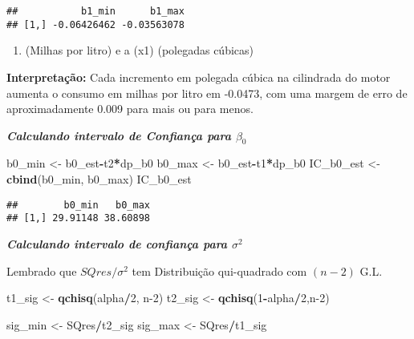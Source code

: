 \documentclass[
]{article}
\newenvironment{Shaded}{\begin{snugshade}}{\end{snugshade}}
\newcommand{\DecValTok}[1]{\textcolor[rgb]{0.00,0.00,0.81}{#1}}
\newcommand{\KeywordTok}[1]{\textcolor[rgb]{0.13,0.29,0.53}{\textbf{#1}}}
\newcommand{\NormalTok}[1]{#1}
\newcommand{\OperatorTok}[1]{\textcolor[rgb]{0.81,0.36,0.00}{\textbf{#1}}}
\newcommand{\StringTok}[1]{\textcolor[rgb]{0.31,0.60,0.02}{#1}}
\providecommand{\tightlist}{%
  \setlength{\itemsep}{0pt}\setlength{\parskip}{0pt}}
\begin{document}
\begin{verbatim}
##           b1_min      b1_max
## [1,] -0.06426462 -0.03563078
\end{verbatim}

\begin{enumerate}
\def\labelenumi{(\alph{enumi})}
\setcounter{enumi}{24}
\tightlist
\item
  (Milhas por litro) e a (x1) (polegadas cúbicas)
\end{enumerate}

\textbf{Interpretação:} Cada incremento em polegada cúbica na cilindrada
do motor aumenta o consumo em milhas por litro em -0.0473, com uma
margem de erro de aproximadamente 0.009 para mais ou para menos.

\textbf{\emph{Calculando intervalo de Confiança para \(\beta_0\)}}

\begin{Shaded}
\begin{Highlighting}[]
\NormalTok{b0_min <-}\StringTok{ }\NormalTok{b0_est}\OperatorTok{-}\NormalTok{t2}\OperatorTok{*}\NormalTok{dp_b0}
\NormalTok{b0_max <-}\StringTok{ }\NormalTok{b0_est}\OperatorTok{-}\NormalTok{t1}\OperatorTok{*}\NormalTok{dp_b0}
\NormalTok{IC_b0_est <-}\StringTok{ }\KeywordTok{cbind}\NormalTok{(b0_min, b0_max)}
\NormalTok{IC_b0_est}
\end{Highlighting}
\end{Shaded}

\begin{verbatim}
##        b0_min   b0_max
## [1,] 29.91148 38.60898
\end{verbatim}

\textbf{\emph{Calculando intervalo de confiança para \(\sigma^2\)}}

Lembrado que \(SQres/\sigma^2\) tem Distribuição qui-quadrado com
\((n-2)\) G.L.

\begin{Shaded}
\begin{Highlighting}[]
\NormalTok{t1_sig <-}\StringTok{ }\KeywordTok{qchisq}\NormalTok{(alpha}\OperatorTok{/}\DecValTok{2}\NormalTok{, n}\DecValTok{-2}\NormalTok{)}
\NormalTok{t2_sig <-}\StringTok{ }\KeywordTok{qchisq}\NormalTok{(}\DecValTok{1}\OperatorTok{-}\NormalTok{alpha}\OperatorTok{/}\DecValTok{2}\NormalTok{,n}\DecValTok{-2}\NormalTok{)}
\end{Highlighting}
\end{Shaded}

\begin{Shaded}
\begin{Highlighting}[]
\NormalTok{sig_min <-}\StringTok{ }\NormalTok{SQres}\OperatorTok{/}\NormalTok{t2_sig}
\NormalTok{sig_max <-}\StringTok{ }\NormalTok{SQres}\OperatorTok{/}\NormalTok{t1_sig}
\end{Highlighting}
\end{Shaded}
\end{document}
